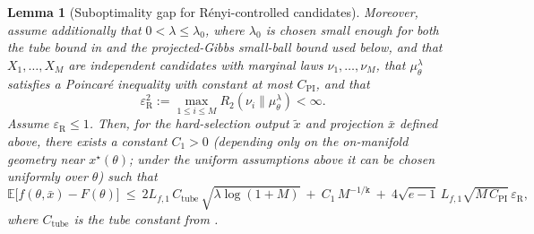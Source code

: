\documentclass{article}
\theoremstyle{normaltheorem}
\newtheorem{lemma}[lemma]{Lemma}
\newcommand{\gibbs}{\mu}
\newcommand{\dimk}{\texttt{k}}
\begin{document}
\begin{lemma}[Suboptimality gap for R\'enyi-controlled candidates]
	Moreover, assume additionally that \(0<\lambda\le\lambda_0\), where \(\lambda_0\) is chosen small enough for both the
	tube bound in  and the projected-Gibbs small-ball bound used below, and that
	\(X_1,\dots,X_M\) are independent candidates with marginal laws
\(\nu_1,\dots,\nu_M\), that \(\gibbs_\theta^\lambda\) satisfies a Poincar\'e inequality with constant at most
\(C_{\mathrm{PI}}\), and that
\[
\varepsilon_{\mathrm R}^2:=\max_{1\le i\le M}R_2(\nu_i\|\gibbs_\theta^\lambda)<\infty.
\]
Assume \(\varepsilon_{\mathrm R}\le1\).
Then, for the hard-selection output \(\tilde x\) and projection \(\bar x\) defined above, there exists a constant
$C_1>0$ (depending only on the on-manifold geometry near $x^\star(\theta)$; under the uniform assumptions above it can be
chosen uniformly over \(\theta\)) such that
		\begin{equation}\label{eq:inner-gap-hardmin}
		\mathbb E\big[f(\theta,\bar x)-F(\theta)\big]
		\ \le\
		2L_{f,1}\,C_{\mathrm{tube}}\,\sqrt{\lambda\log(1+M)}
		\ +\ C_1\,M^{-1/\dimk}
		\ +\ 4\sqrt{e-1}\,L_{f,1}\sqrt{M\,C_{\mathrm{PI}}}\,\varepsilon_{\mathrm R},
		\end{equation}
		where $C_{\mathrm{tube}}$ is the tube constant from .
\end{lemma}
\end{document}
